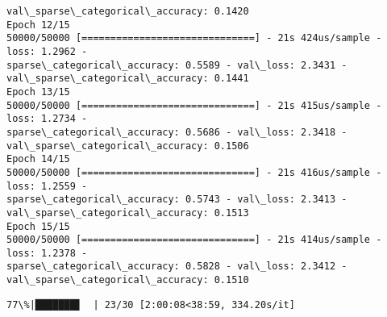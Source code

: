 \documentclass[11pt]{article}
\begin{document}
\begin{Verbatim}[commandchars=\\\{\}]
val\_sparse\_categorical\_accuracy: 0.1420
Epoch 12/15
50000/50000 [==============================] - 21s 424us/sample - loss: 1.2962 -
sparse\_categorical\_accuracy: 0.5589 - val\_loss: 2.3431 -
val\_sparse\_categorical\_accuracy: 0.1441
Epoch 13/15
50000/50000 [==============================] - 21s 415us/sample - loss: 1.2734 -
sparse\_categorical\_accuracy: 0.5686 - val\_loss: 2.3418 -
val\_sparse\_categorical\_accuracy: 0.1506
Epoch 14/15
50000/50000 [==============================] - 21s 416us/sample - loss: 1.2559 -
sparse\_categorical\_accuracy: 0.5743 - val\_loss: 2.3413 -
val\_sparse\_categorical\_accuracy: 0.1513
Epoch 15/15
50000/50000 [==============================] - 21s 414us/sample - loss: 1.2378 -
sparse\_categorical\_accuracy: 0.5828 - val\_loss: 2.3412 -
val\_sparse\_categorical\_accuracy: 0.1510
    \end{Verbatim}

    \begin{Verbatim}[commandchars=\\\{\}]
 77\%|███████▋  | 23/30 [2:00:08<38:59, 334.20s/it]
    \end{Verbatim}
\end{document}
